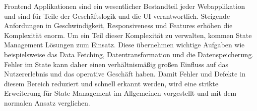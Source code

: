 Frontend Applikationen sind ein wesentlicher Bestandteil jeder Webapplikation und sind für Teile der Geschäftslogik und die UI verantwortlich. Steigende Anfordungen in Geschwindigkeit, Responsiveness und Features erhöhen die Komplexität enorm. Um ein Teil dieser Komplexität zu verwalten, kommen State Management Lösungen zum Einsatz. Diese übernehmen wichtige Aufgaben wie beispielsweise das Data Fetching, Datentransformation und die Datenspeicherung. Fehler im State kann daher einen verhältnismäßig großen Einfluss auf das Nutzererlebnis und das operative Geschäft haben. Damit Fehler und Defekte in diesem Bereich reduziert und schnell erkannt werden, wird eine strikte Erweiterung für State Management im Allgemeinen vorgestellt und mit dem normalen Ansatz verglichen.